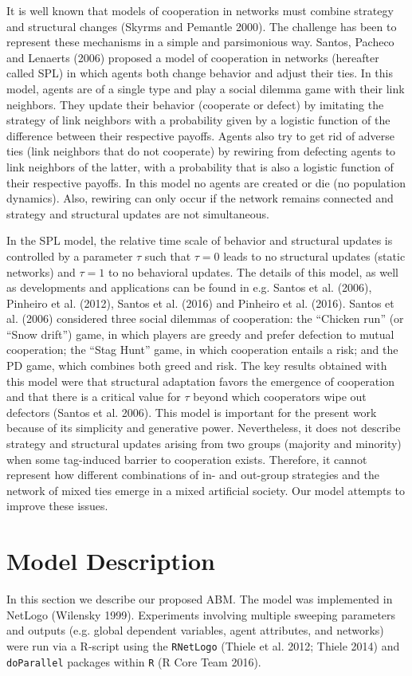 It is well known that models of cooperation in networks must combine strategy and structural changes (Skyrms and Pemantle 2000). The challenge has been to represent these mechanisms in a simple and parsimonious way. Santos, Pacheco and Lenaerts (2006) proposed a model of cooperation in networks (hereafter called SPL) in which agents both change behavior and adjust their ties. In this model, agents are of a single type and play a social dilemma game with their link neighbors. They update their behavior (cooperate or defect) by imitating the strategy of link neighbors with a probability given by a logistic function of the difference between their respective payoffs. Agents also try to get rid of adverse ties (link neighbors that do not cooperate) by rewiring from defecting agents to link neighbors of the latter, with a probability that is also a logistic function of their respective payoffs. In this model no agents are created or die (no population dynamics). Also, rewiring can only occur if the network remains connected and strategy and structural updates are not simultaneous.

In the SPL model, the relative time scale of behavior and structural updates is controlled by a parameter $ \tau $ such that $ \tau = 0 $ leads to no structural updates (static networks) and $ \tau = 1 $ to no behavioral updates. The details of this model, as well as developments and applications can be found in e.g. Santos et al. (2006), Pinheiro et al. (2012), Santos et al. (2016) and Pinheiro et al. (2016). Santos et al. (2006) considered three social dilemmas of cooperation: the ``Chicken run'' (or ``Snow drift'') game, in which players are greedy and prefer defection to mutual cooperation; the ``Stag Hunt'' game, in which cooperation entails a risk; and the PD game, which combines both greed and risk. The key results obtained with this model were that structural adaptation favors the emergence of cooperation and that there is a critical value for  $ \tau $ beyond which cooperators wipe out defectors (Santos et al. 2006). This model is important for the present work because of its simplicity and generative power. Nevertheless, it does not describe strategy and structural updates arising from two groups (majority and minority) when some tag-induced barrier to cooperation exists. Therefore, it cannot represent how different combinations of in- and out-group strategies and the network of mixed ties emerge in a mixed artificial society. Our model attempts to improve these issues.

\section{Model Description}
In this section we describe our proposed ABM. The model was implemented in NetLogo (Wilensky 1999). Experiments involving multiple sweeping parameters and outputs (e.g. global dependent variables, agent attributes, and networks) were run via a R-script using the \texttt{RNetLogo} (Thiele et al. 2012; Thiele 2014) and \texttt{doParallel} packages within \texttt{R} (R Core Team 2016).

